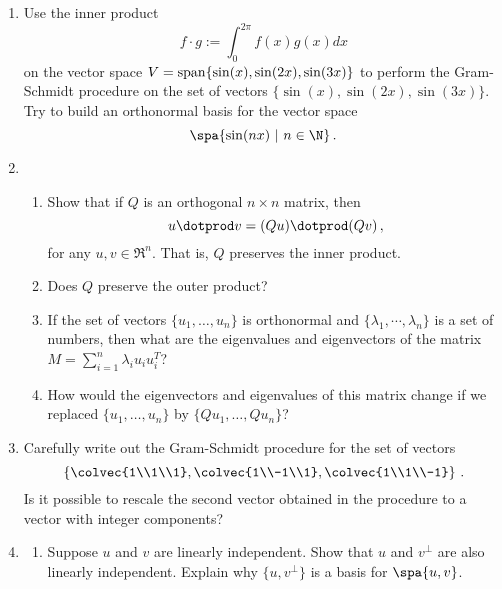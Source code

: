 \begin{enumerate}
\item Use the inner product \[f\cdot g := \int_0^{2\pi} f(x)g(x)dx\]  on the vector space $V={\rm span} \{\sin(x),\sin(2x),\sin(3x) \}$ to perform the Gram-Schmidt procedure on the set of vectors $\{\sin(x),\sin(2x),\sin(3x) \}$. \\
Try to build an orthonormal basis for the vector space \[\spa \{ \sin(nx)~| ~n\in \N \}\, .\]
\item 
\begin{enumerate}
\item
Show that if $Q$ is an orthogonal $n\times n$ matrix, then \[u\dotprod v = (Qu)\dotprod (Qv)\, ,\] for any $u,v\in \Re^n$. That is, $Q$ preserves the inner product. 
\item Does $Q$ preserve the outer product? 
\item  If the set of vectors $\{ u_1,\dots,u_n\}$ is orthonormal and $\{ \lambda_1,\cdots,\lambda_n\}$ is a set of numbers, 
then what are the eigenvalues and eigenvectors of the matrix
$M=\sum_{i=1}^n \lambda_i u_i u_i^T$? 
\item How would the eigenvectors and eigenvalues of this matrix change if we replaced  $\{ u_1,\dots,u_n\}$ by $\{ Qu_1,\dots,Q u_n\}$?
\end{enumerate}


\item Carefully write out the Gram-Schmidt procedure for the set of vectors 
\[\left\{ \colvec{1\\1\\1}, \colvec{1\\-1\\1}, \colvec{1\\1\\-1} \right\} \, .\] Is it possible to rescale the second vector obtained in the procedure to a vector with integer components? 


\item 
\label{basisortho}
\begin{enumerate}
\item Suppose $u$ and $v$ are linearly independent.  Show that $u$ and $v^\perp$ are also linearly independent.  Explain why $\{u, v^\perp\}$ is a basis for $\spa \{u,v\}$.





\end{enumerate}
\end{enumerate}
